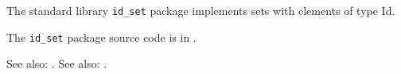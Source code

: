 
The standard library {\tt id\_set} package implements sets with elements of type Id.

The {\tt id\_set} package source code is in .

See also:  .
See also:  .


